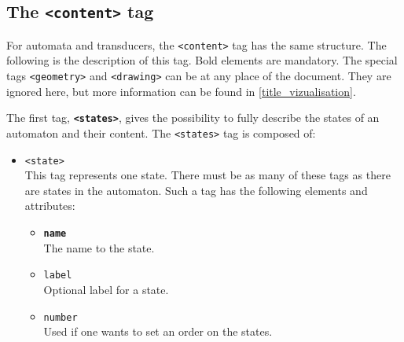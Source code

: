 \documentclass[a4paper]{article}
\newcommand{\xtag}[1]{\texttt{<#1>}}
\newcommand{\xattr}[1]{\texttt{#1}}
\def\contenttag{\xtag{content}}
\def\statestag{\xtag{states}}
\def\statetag{\xtag{state}}
\def\geometrytag{\xtag{geometry}}
\def\drawingtag{\xtag{drawing}}
\begin{document}
\subsection{The \contenttag{} tag}

For automata and transducers, the \contenttag{} tag has the same
structure.  The following is the description of this tag. Bold
elements are mandatory.  The special tags \geometrytag{} and
\drawingtag{} can be at any place of the document. They are ignored
here, but more information can be found in
\autoref{title_vizualisation}.

\medskip

The first tag, \textbf{\statestag{}}, gives the possibility to fully
describe the states of an automaton and their content. The
\statestag{} tag is composed of:
\begin{itemize}
\item \statetag{}\\
  This tag represents one state. There must be as many of these tags
  as there are states in the automaton. Such a tag has the following
  elements and attributes:
  \begin{itemize}
  \item \textbf{\xattr{name}}\\
    The name to the state.
  \item \xattr{label}\\
    Optional label for a state.
  \item \xattr{number}\\
    Used if one wants to set an order on the states.~\\
  \end{itemize}
\end{itemize}
\end{document}
